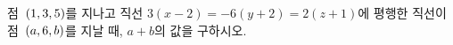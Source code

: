 점~$(1{,}\mkern3mu\mathopen{}3{,}\mkern3mu\mathopen{}5)$를 지나고 직선 $3(x-2)=-6(y+2)=2(z+1)$에 평행한 직선이 점~$(a{,}\mkern3mu\mathopen{}6{,}\mkern3mu\mathopen{}b)$를 지날 때, $a+b$의 값을 구하시오.
